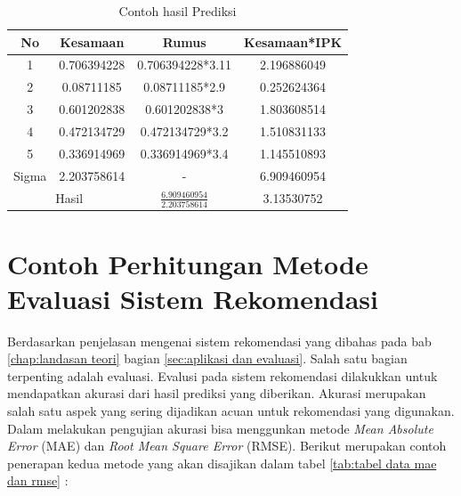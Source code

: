 \begin{table}[H]
    \centering
    \renewcommand{\arraystretch}{1.5}
    \begin{tabular}{|c|c|c|c|}
        \hline
        No & Kesamaan & Rumus & Kesamaan*IPK \\
        \hline
        1 & 0.706394228 & 0.706394228*3.11 & 2.196886049 \\
        \hline
        2 & 0.08711185 & 0.08711185*2.9 &  0.252624364 \\
        \hline
        3 & 0.601202838 & 0.601202838*3 & 1.803608514 \\
        \hline
        4 & 0.472134729 & 0.472134729*3.2 & 1.510831133 \\
        \hline
        5 & 0.336914969 & 0.336914969*3.4 & 1.145510893 \\
        \hline
        Sigma & 2.203758614 & - & 6.909460954 \\
        \hline
        \multicolumn{2}{|c|}{Hasil} & $\frac{6.909460954}{2.203758614}$ & 3.13530752\\
        \hline
    \end{tabular}
    \caption{Contoh hasil Prediksi}
    \label{tab:prediksi}
\end{table}

\section{Contoh Perhitungan Metode Evaluasi Sistem Rekomendasi}
\label{sec:contoh perhitungan evaluasi}

Berdasarkan penjelasan mengenai sistem rekomendasi yang dibahas pada bab \ref{chap:landasan teori} bagian \ref{sec:aplikasi dan evaluasi}. Salah satu bagian terpenting adalah evaluasi. Evalusi pada sistem rekomendasi dilakukkan untuk mendapatkan akurasi dari hasil prediksi yang diberikan. Akurasi merupakan salah satu aspek yang sering dijadikan acuan untuk rekomendasi yang digunakan. Dalam melakukan pengujian akurasi bisa menggunkan metode \textit{Mean Absolute Error} (MAE) dan \textit{Root Mean Square Error} (RMSE). Berikut merupakan contoh penerapan kedua metode yang akan disajikan dalam tabel \ref{tab:tabel data mae dan rmse} :

